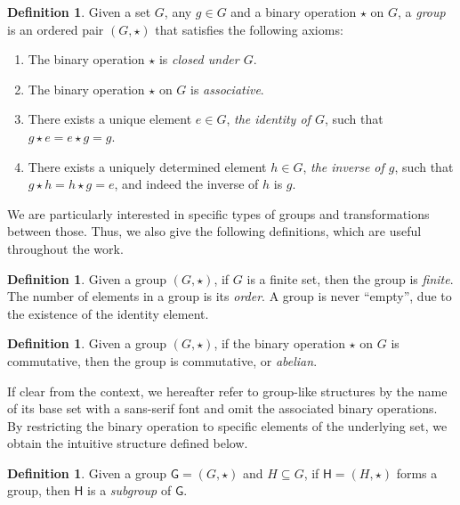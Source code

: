 \documentclass[12pt, a4paper, oneside]{memoir}
\theoremstyle{definition}
\newtheorem{definition}[theorem]{Definition}
\begin{document}
\begin{definition}
  Given a set $G$, any $g \in G$ and a binary operation $\star$ on $G$, a \emph{group} is an ordered pair $(G, \star)$ that satisfies the following axioms:

  \begin{enumerate}
    \item The binary operation $\star$ is \emph{closed under $G$}.
    \item The binary operation $\star$ on $G$ is \emph{associative}.
    \item There exists a unique element $e \in G$, \emph{the identity of $G$}, such that $g \star e = e \star g = g$.
    \item There exists a uniquely determined element $h \in G$, \emph{the inverse of $g$}, such that $g \star h = h \star g = e$, and indeed the inverse of $h$ is $g$.
  \end{enumerate}
\end{definition}

We are particularly interested in specific types of groups and transformations between those. Thus, we also give the following definitions, which are useful throughout the work.

\begin{definition}
  Given a group $(G, \star)$, if $G$ is a finite set, then the group is \emph{finite}. The number of elements in a group is its \emph{order}. A group is never ``empty'', due to the existence of the identity element.
\end{definition}

\begin{definition}
  Given a group $(G, \star)$, if the binary operation $\star$ on $G$ is commutative, then the group is commutative, or \emph{abelian}.
\end{definition}

If clear from the context, we hereafter refer to group-like structures by the name of its base set with a sans-serif font and omit the associated binary operations. By restricting the binary operation to specific elements of the underlying set, we obtain the intuitive structure defined below.

\begin{definition}\label{def:subgroup}
  Given a group $\textsf{G} = (G, \star)$ and $H \subseteq G$, if $\mathsf{H} = (H, \star)$ forms a group, then $\mathsf{H}$ is a \emph{subgroup} of $\mathsf{G}$.
\end{definition}
\end{document}
